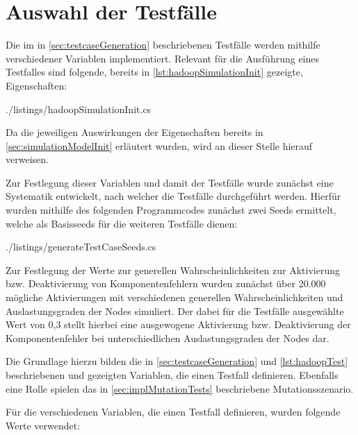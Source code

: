 \section{Auswahl der Testfälle}
\label{sec:selectTestcases}

Die im in \autoref{sec:testcaseGeneration} beschriebenen Testfälle werden mithilfe verschiedener Variablen implementiert.
Relevant für die Ausführung eines Testfalles sind folgende, bereits in \autoref{lst:hadoopSimulationInit} gezeigte, Eigenschaften:


{./listings/hadoopSimulationInit.cs}

Da die jeweiligen Auswirkungen der Eigenschaften bereits in \autoref{sec:simulationModelInit} erläutert wurden, wird an dieser Stelle hierauf verweisen.

Zur Festlegung dieser Variablen und damit der Testfälle wurde zunächst eine Systematik entwickelt, nach welcher die Testfälle durchgeführt werden.
Hierfür wurden mithilfe des folgenden Programmcodes zunächst zwei Seeds ermittelt, welche als Basisseeds für die weiteren Testfälle dienen:


{./listings/generateTestCaseSeeds.cs}

Zur Festlegung der Werte zur generellen Wahrscheinlichkeiten zur Aktivierung bzw. Deaktivierung von Komponentenfehlern wurden zunächst über 20.000 mögliche Aktivierungen mit verschiedenen generellen Wahrscheinlichkeiten und Auslastungsgraden der Nodes simuliert.
Der dabei für die Testfälle ausgewählte Wert von 0,3 stellt hierbei eine ausgewogene Aktivierung bzw. Deaktivierung der Komponentenfehler bei unterschiedlichen Auslastungsgraden der Nodes dar.



Die Grundlage hierzu bilden die in \autoref{sec:testcaseGeneration} und \autoref{lst:hadoopTest} beschriebenen und gezeigten Variablen, die einen Testfall definieren.
Ebenfalls eine Rolle spielen das in \autoref{sec:implMutationTests} beschriebene Mutationsszenario.

Für die verschiedenen Variablen, die einen Testfall definieren, wurden folgende Werte verwendet:

